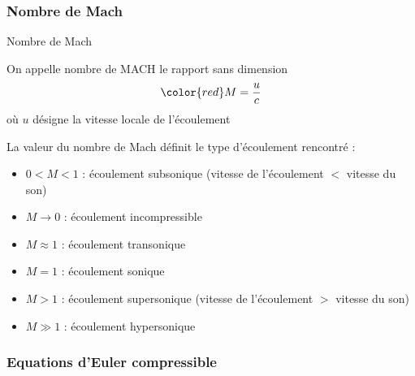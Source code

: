 \subsubsection{Nombre de Mach}
\begin{frame}{Nombre de Mach}

\small

On appelle \textcolor{vert}{nombre de MACH} le rapport sans dimension
\[
	\color{red}
	M = \frac{u}{c}
\]
où $u$ désigne la vitesse locale de l'écoulement %

\medskip
\pause


\bigskip
\pause

La valeur du nombre de Mach définit le type d'écoulement rencontré :

\smallskip

\begin{itemize}
\item
	$0 < M <1$ : écoulement \textcolor{vert}{subsonique} (vitesse de l'écoulement $<$ vitesse du son)
\item
	$M \rightarrow 0$ : écoulement \textcolor{vert}{incompressible}
\item
	$M \approx 1$ : écoulement \textcolor{vert}{transonique}
\item
	$M=1$ : écoulement \textcolor{vert}{sonique}
\item
	$M > 1$ : écoulement \textcolor{vert}{supersonique} (vitesse de l'écoulement $>$ vitesse du son)
\item
	$M \gg 1$ : écoulement \textcolor{vert}{hypersonique}
\end{itemize}

\vspace{0mm}

\end{frame}





\subsubsection{Equations d'Euler compressible}

